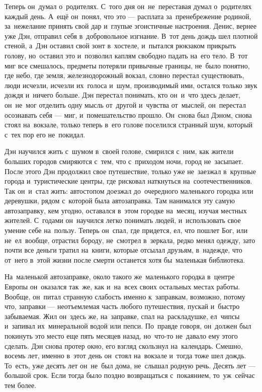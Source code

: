 Теперь он~думал о~родителях.
С~того дня он~не~переставая думал о~родителях каждый день.
А~ещё он~понял, что это --- расплата за~пренебрежение родиной, за~нежелание принять свой дар и~глупые эгоистичные настроения.
Денис, вернее уже Дэн, отправил себя в~добровольное изгнание.
В~тот день дождь шел плотной стеной, а~Дэн оставил свой зонт в~хостеле, и~пытался рюкзаком прикрыть голову, но~оставил это и~позволил каплям свободно падать на~его тело.
В~тот миг все смешалось, предметы потеряли привычные границы, не~было понятно, где небо, где земля, железнодорожный вокзал, словно перестал существовать, люди исчезли, исчезли их~голоса и~шум, производимый ими, остался только звук дождя и~ничего больше.
Дэн перестал понимать, кто он~и~что здесь делает, он~не~мог отделить одну мысль от~другой и~чувства от~мыслей, он~перестал осознавать себя --- миг, и~помешательство прошло.
Он~снова был Дэном, снова стоял на~вокзале, только теперь в~его голове поселился странный шум, который с~тех пор его не~покидал.

Дэн научился жить с~шумом в~своей голове, смирился с~ним, как жители больших городов смиряются с~тем, что с~приходом ночи, город не~засыпает.
После этого Дэн продолжил свое путешествие, только уже не~заезжал в~крупные города и~туристические центры, где рисковал наткнуться на~соотечественников.
Так он~и~стал жить: автостопом доезжал до~очередного маленького городка или деревушки, рядом с~которой была автозаправка.
Там нанимался эту самую автозаправку, кем угодно, оставался в~этом городке на~месяц, изучая местных жителей.
С~годами он~научился легко понимать людей, и~использовать свое умение себе на~пользу.
Теперь он~спал, где придется, ел, что пошлет Бог, или не~ел~вообще, отрастил бороду, не~смотрел в~зеркала, редко менял одежду, зато почти все деньги тратил на~книги, которые отсылал друзьям, в~надежде, что от~него в~этой жизни после смерти останется хотя бы~маленькая библиотека.

На~маленькой автозаправке, около такого же~маленького городка в~центре Европы он~оказался так~же, как и~на~всех своих остальных местах работы.
Вообще, он~питал странную слабость именно к~заправкам, возможно, потому что, заправки --- неотъемлемая часть любого путешествия, пускай и~быстро забываемая.
Жил он~здесь же, на~заправке, спал на~раскладушке, ел~чипсы и~запивал их~минеральной водой или пепси.
По~правде говоря, он~должен был покинуть это место еще пять месяцев назад, но~что-то не~давало ему этого сделать.
Дэн снова протер окно, его взгляд скользнул на~календарь.
Смешно, восемь лет, именно в~этот день он~стоял на~вокзале и~тогда тоже шел дождь.
То~есть, уже десять лет он~не~был дома, не~слышал родную речь.
Десять лет --- большой срок.
Если тогда было поздно возвращаться с~покаянием, то~уж~сейчас тем более.

